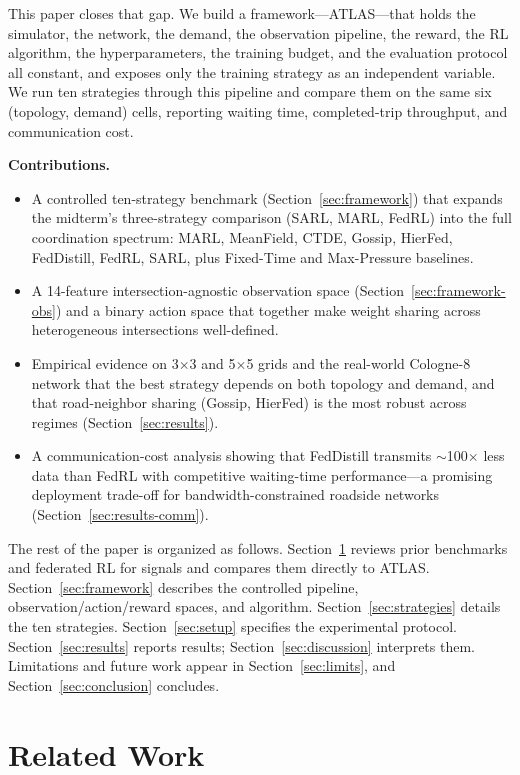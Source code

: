 \documentclass[conference]{IEEEtran}
\begin{document}
This paper closes that gap. We build a framework---ATLAS---that holds the simulator, the network, the demand, the observation pipeline, the reward, the RL algorithm, the hyperparameters, the training budget, and the evaluation protocol all constant, and exposes only the training strategy as an independent variable. We run ten strategies through this pipeline and compare them on the same six (topology, demand) cells, reporting waiting time, completed-trip throughput, and communication cost.

\textbf{Contributions.}
\begin{itemize}
  \item A controlled ten-strategy benchmark (Section~\ref{sec:framework}) that expands the midterm's three-strategy comparison (SARL, MARL, FedRL) into the full coordination spectrum: MARL, MeanField, CTDE, Gossip, HierFed, FedDistill, FedRL, SARL, plus Fixed-Time and Max-Pressure baselines.
  \item A 14-feature intersection-agnostic observation space (Section~\ref{sec:framework-obs}) and a binary action space that together make weight sharing across heterogeneous intersections well-defined.
  \item Empirical evidence on 3$\times$3 and 5$\times$5 grids and the real-world Cologne-8 network that the best strategy depends on both topology and demand, and that road-neighbor sharing (Gossip, HierFed) is the most robust across regimes (Section~\ref{sec:results}).
  \item A communication-cost analysis showing that FedDistill transmits $\sim$100$\times$ less data than FedRL with competitive waiting-time performance---a promising deployment trade-off for bandwidth-constrained roadside networks (Section~\ref{sec:results-comm}).
\end{itemize}

The rest of the paper is organized as follows. Section~\ref{sec:related} reviews prior benchmarks and federated RL for signals and compares them directly to ATLAS. Section~\ref{sec:framework} describes the controlled pipeline, observation/action/reward spaces, and algorithm. Section~\ref{sec:strategies} details the ten strategies. Section~\ref{sec:setup} specifies the experimental protocol. Section~\ref{sec:results} reports results; Section~\ref{sec:discussion} interprets them. Limitations and future work appear in Section~\ref{sec:limits}, and Section~\ref{sec:conclusion} concludes.

\section{Related Work}\label{sec:related}
\end{document}
